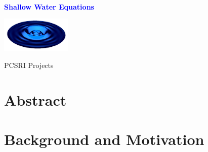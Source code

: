\documentclass{softwaremanual}
\author{Joseph Schoonover}
\date{}
\newcommand{\swlogo}{{\includegraphics[width=0.25\textwidth]{../images/shallowWater.png}}
}
\begin{document}
\frontmatter
\begin{titlingpage}
    
        \vspace*{2cm}

   {\selectfont
   \begin{center}
     \\

     \huge{\textbf{\textcolor{blue}{Shallow Water Equations}}}
   \end{center}
    }    
 
        \vspace{1cm}
        
        \begin{center}
         \swlogo
        \end{center}
        
        \vspace{2cm}
        
     \begin{center}
     
        {\selectfont
        \huge{
           PCSRI Projects
        }
        
        \vspace{1.5cm}
        
        \textbf{
        \large{
           \theauthor 
         }}}
        
        \vfill
        
        
     \end{center}
        
    
\end{titlingpage}


{\selectfont
\tableofcontents
}
\mainmatter

\pagestyle{myheadings}

\chapter*{Abstract}


\chapter{Background and Motivation}
\end{document}

